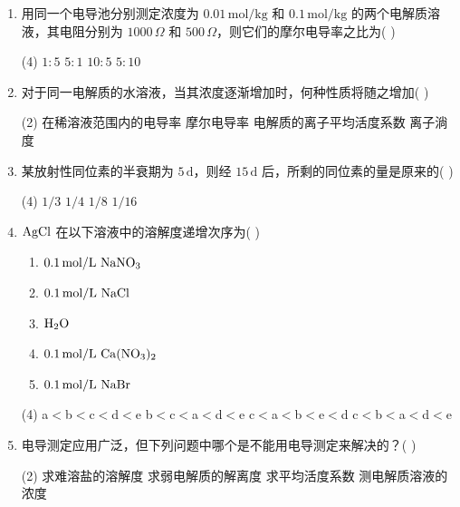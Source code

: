 \begin{enumerate}[label=\arabic*., itemsep=1.5ex]
    \item 用同一个电导池分别测定浓度为 $0.01\,\mathrm{mol/kg}$ 和 $0.1\,\mathrm{mol/kg}$ 的两个电解质溶液，其电阻分别为 $1000\,\Omega$ 和 $500\,\Omega$，则它们的摩尔电导率之比为( )
    \begin{tasks}(4)
        \task $1:5$
        \task $5:1$
        \task $10:5$
        \task $5:10$
    \end{tasks}

    \item 对于同一电解质的水溶液，当其浓度逐渐增加时，何种性质将随之增加( )
    \begin{tasks}(2)
        \task 在稀溶液范围内的电导率
        \task 摩尔电导率
        \task 电解质的离子平均活度系数
        \task 离子淌度
    \end{tasks}

    \item 某放射性同位素的半衰期为 $5\,\mathrm{d}$，则经 $15\,\mathrm{d}$ 后，所剩的同位素的量是原来的( )
    \begin{tasks}(4)
        \task $1/3$
        \task $1/4$
        \task $1/8$
        \task $1/16$
    \end{tasks}

    \item $\ce{AgCl}$ 在以下溶液中的溶解度递增次序为( )
    \begin{enumerate}
        \item $0.1\,\mathrm{mol/L}\ \ce{NaNO3}$
        \item $0.1\,\mathrm{mol/L}\ \ce{NaCl}$
        \item $\ce{H2O}$
        \item $0.1\,\mathrm{mol/L}\ \ce{Ca(NO3)2}$
        \item $0.1\,\mathrm{mol/L}\ \ce{NaBr}$
    \end{enumerate}
    \begin{tasks}(4)
        \task a$<$b$<$c$<$d$<$e
        \task b$<$c$<$a$<$d$<$e
        \task c$<$a$<$b$<$e$<$d
        \task c$<$b$<$a$<$d$<$e
    \end{tasks}

    \item 电导测定应用广泛，但下列问题中哪个是不能用电导测定来解决的？( )
    \begin{tasks}(2)
        \task 求难溶盐的溶解度
        \task 求弱电解质的解离度
        \task 求平均活度系数
        \task 测电解质溶液的浓度
    \end{tasks}


\end{enumerate}
